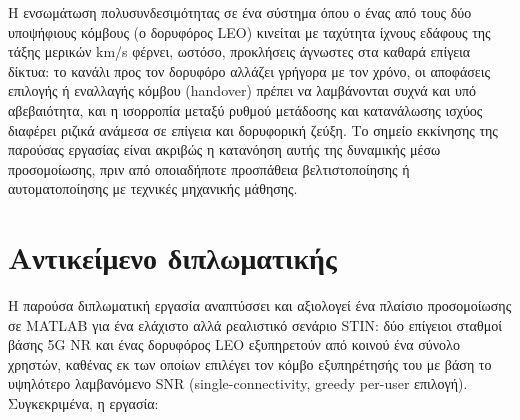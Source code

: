 Η ενσωμάτωση πολυσυνδεσιμότητας σε ένα σύστημα όπου ο ένας από τους δύο
υποψήφιους κόμβους (ο δορυφόρος LEO) κινείται με ταχύτητα ίχνους εδάφους
της τάξης μερικών km/s φέρνει, ωστόσο, προκλήσεις άγνωστες στα καθαρά
επίγεια δίκτυα: το κανάλι προς τον δορυφόρο αλλάζει γρήγορα με τον χρόνο,
οι αποφάσεις επιλογής ή εναλλαγής κόμβου (handover) πρέπει να λαμβάνονται
συχνά και υπό αβεβαιότητα, και η ισορροπία μεταξύ ρυθμού μετάδοσης και
κατανάλωσης ισχύος διαφέρει ριζικά ανάμεσα σε επίγεια και δορυφορική
ζεύξη. Το σημείο εκκίνησης της παρούσας εργασίας είναι ακριβώς η
κατανόηση αυτής της δυναμικής μέσω προσομοίωσης, πριν από οποιαδήποτε
προσπάθεια βελτιστοποίησης ή αυτοματοποίησης με τεχνικές μηχανικής
μάθησης.

\section{Αντικείμενο διπλωματικής}
\label{sec:intro-objective}

Η παρούσα διπλωματική εργασία αναπτύσσει και αξιολογεί ένα πλαίσιο
προσομοίωσης σε MATLAB για ένα ελάχιστο αλλά ρεαλιστικό σενάριο STIN: δύο
επίγειοι σταθμοί βάσης 5G NR και ένας δορυφόρος LEO εξυπηρετούν από κοινού
ένα σύνολο χρηστών, καθένας εκ των οποίων επιλέγει τον κόμβο εξυπηρέτησής
του με βάση το υψηλότερο λαμβανόμενο SNR (single-connectivity, greedy
per-user επιλογή). Συγκεκριμένα, η εργασία:


